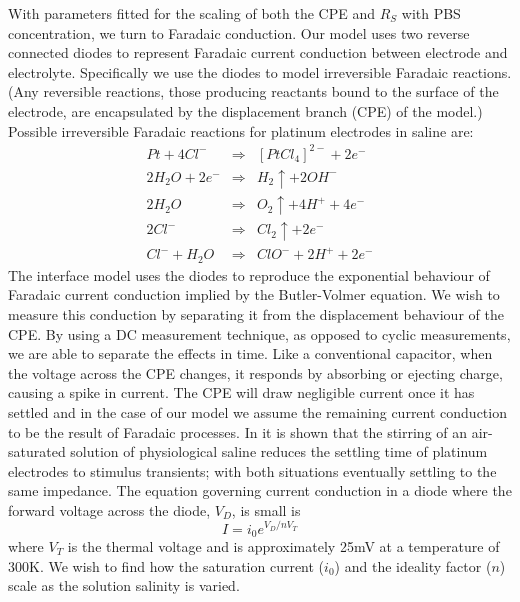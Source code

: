 \documentclass[journal, a4paper]{IEEEtran}
\begin{document}
With parameters fitted for the scaling of both the CPE and $R_{S}$ with PBS concentration, we turn to Faradaic conduction.
{
    \color{blue}
    Our model uses two reverse connected diodes to represent Faradaic current conduction between electrode and electrolyte. Specifically we use the diodes to model irreversible Faradaic reactions. (Any reversible reactions, those producing reactants bound to the surface of the electrode, are encapsulated by the displacement branch (CPE) of the model.)
    Possible irreversible Faradaic reactions for platinum electrodes in saline are:
    \begin{eqnarray}
        Pt + 4Cl^{-} &\Rightarrow& [PtCl_{4}]^{2-} + 2 e^{-}\\
        2H_{2}O + 2 e^{-} &\Rightarrow& H_{2}\uparrow + 2OH^{-}\\
        2H_{2}O &\Rightarrow& O_{2}\uparrow + 4H^{+} + 4e^{-}\\
        2Cl^{-} &\Rightarrow& Cl_{2}\uparrow + 2e^{-}\\
        Cl^{-} + H_{2}O &\Rightarrow& ClO^{-} + 2H^{+} + 2e^{-}
    \end{eqnarray}
}
The interface model uses the diodes to reproduce the exponential behaviour of Faradaic current conduction implied by the Butler-Volmer equation. We wish to measure this conduction by separating it from the displacement behaviour of the CPE. By using a DC measurement technique, as opposed to cyclic measurements, we are able to separate the effects in time.
Like a conventional capacitor, when the voltage across the CPE changes, it responds by absorbing or ejecting charge, causing a spike in current. The CPE will draw negligible current once it has settled and in the case of our model we assume the remaining current conduction to be the result of Faradaic processes.
{\color{blue} In \cite{Greatbatch1969} it is shown that the stirring of an air-saturated solution of physiological saline reduces the settling time of platinum electrodes to stimulus transients; with both situations eventually settling to the same impedance.}
The equation governing current conduction in a diode where the forward voltage across the diode, $V_{D}$, is small is
\begin{equation}
    I = i_{0}  e^{V_{D} / n V_{T}}
\end{equation}
where $V_{T}$ is the thermal voltage and is approximately 25\thinspace mV at a temperature of 300\thinspace K. We wish to find how the saturation current ($i_{0}$) and the ideality factor ($n$) scale as the solution salinity is varied.
\end{document}
